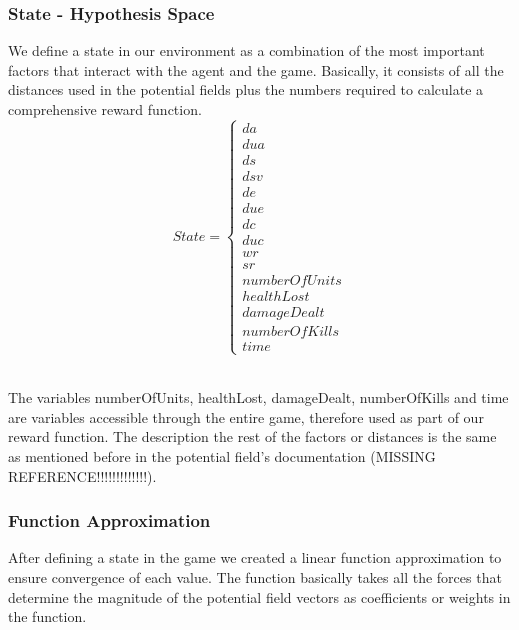 \subsubsection{State - Hypothesis Space}

We define a state in our environment as a combination of the most important factors that interact with the agent and the game. Basically, it consists of all the distances used in the potential fields plus the numbers required to calculate a comprehensive reward function. \\
\begin{displaymath}
                       State = \begin{cases}
                         da \\  dua \\  ds \\  dsv \\ de \\ due \\ dc \\ duc \\ wr \\ sr \\ numberOfUnits \\ healthLost \\ damageDealt \\ numberOfKills \\ time
                      \end{cases}
\end{displaymath}

\\The variables numberOfUnits, healthLost, damageDealt, numberOfKills and time are variables accessible through the entire game, therefore used as part of our reward function. The description the rest of the factors or distances is the same as mentioned before in the potential field's documentation (MISSING REFERENCE!!!!!!!!!!!!!). 

\subsubsection{Function Approximation}

After defining a state in the game we created a linear function approximation to ensure convergence of each value. The function basically takes all the forces that determine the magnitude of the potential field vectors as coefficients or weights in the  function. \\ 

